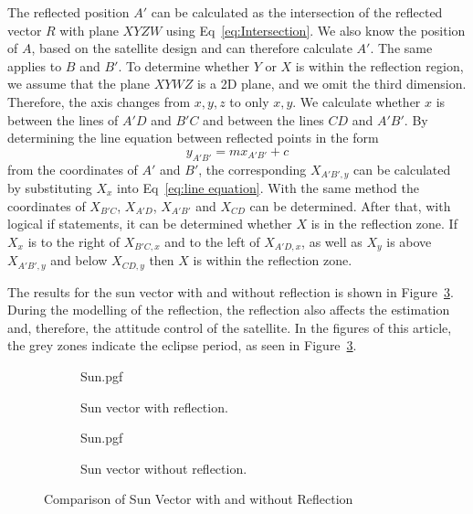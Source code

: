 \documentclass[letterpaper, 10 pt, conference]{ieeeconf}  %
\begin{document}
The reflected position $A'$ can be calculated as the intersection of the reflected vector $R$ with plane $XYZW$ using Eq~\ref{eq:Intersection}. We also know the position of $A$, based on the satellite design and can therefore calculate $A'$. The same applies to $B$ and $B'$. To determine whether $Y$ or $X$ is within the reflection region, we assume that the plane $XYWZ$ is a 2D plane, and we omit the third dimension. Therefore, the axis changes from $x, y, z$ to only $x, y$. We calculate whether $x$ is between the lines of $A'D$ and $B'C$ and between the lines $CD$ and $A'B'$. By determining the line equation between reflected points in the form 
\begin{equation}
y_{A'B'} = mx_{A'B'} + c
\label{eq:line equation}
\end{equation}
from the coordinates of $A'$ and $B'$, the corresponding $X_{A'B',y}$ can be calculated by substituting $X_x$ into Eq~\ref{eq:line equation}. With the same method the coordinates of $X_{B'C}$, $X_{A'D}$, $X_{A'B'}$ and $X_{CD}$ can be determined. After that, with logical if statements, it can be determined whether $X$ is in the reflection zone. If $X_x$ is to the right of $X_{B'C,x}$ and to the left of $X_{A'D,x}$, as well as $X_y$ is above $X_{A'B',y}$ and below $X_{CD,y}$ then $X$ is within the reflection zone. 

The results for the sun vector with and without reflection is shown in Figure~\ref{fig:Sun Vector comparison}. During the modelling of the reflection, the reflection also affects the estimation and, therefore, the attitude control of the satellite. In the figures of this article, the grey zones indicate the eclipse period, as seen in Figure~\ref{fig:Sun Vector comparison}.

\begin{figure}[!htb]
	\begin{subfigure}{.5\textwidth}
		\centering
		{Sun.pgf}
		\caption[Sun vector with reflection]{Sun vector with reflection.}
		\label{fig:Sun Vector comparison with reflection}
	\end{subfigure}
	\begin{subfigure}{.5\textwidth}
		\centering
		{Sun.pgf} 
		\caption[Sun vector without reflection]{Sun vector without reflection.}
		\label{fig:Sun Vector comparison without reflection}
	\end{subfigure}
	
	\caption{Comparison of Sun Vector with and without Reflection}
	\label{fig:Sun Vector comparison}
	
\end{figure}
\end{document}
